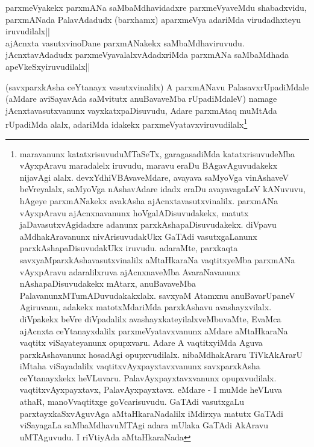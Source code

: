 
\begin{artha} 
parxmeVyakekx parxmANa saMbaMdhavidadxre parxmeVyaveMdu shabadxvidu, 
parxmANada PalavAdadudx (barxhamx) aparxmeVya adariMda virudadhxteyu 
iruvudilalx||\\
ajAcnxta vasutxvinoDane parxmANakekx saMbaMdhaviruvudu. 
jAcnxtavAdadudx parxmeVyavalalxvAdadxriMda parxmANa saMbaMdhada 
apeVkeSxyiruvudilalx||
\end{artha}


\begin{artha} 
(savxparxkAsha ceYtanayx vasutxvinalilx) A parxmANavu 
PalasavxrUpadiMdale (aMdare aviSayavAda saMvitutx anuBavaveMba 
rUpadiMdaleV) namage jAcnxtavasutxvanunx vayxkatxpaDisuvudu, Adare 
parxmAtaq muMtAda rUpadiMda alalx, adariMda idakekx 
parxmeVyatavxviruvudilalx\footnote[1]{maravanunx 
katatxrisuvuduMTaSeTx, garagasadiMda katatxrisuvudeMba vAyxpAravu 
maradalelx iruvudu, maravu eraDu BAgavAguvudakekx nijavAgi alalx. 
devxYdhiVBAvaveMdare, avayava saMyoVga vinAshaveV beVreyalalx, 
saMyoVga nAshavAdare idadx eraDu avayavagaLeV kANuvuvu, hAgeye 
parxmANakekx avakAsha ajAcnxtavasutxvinalilx. parxmANa vAyxpAravu 
ajAcnxnavanunx hoVgalADisuvudakekx, matutx jaDavasutxvAgidadxre 
adanunx parxkAshapaDisuvudakekx. diVpavu aMdhakAravanunx 
nivArisuvudakUkx GaTAdi vasutxgaLanunx parxkAshapaDisuvudakUkx 
iruvudu. adaraMte, parxkaqta savxyaMparxkAshavasutxvinalilx 
aMtaHkaraNa vaqtitxyeMba parxmANa vAyxpAravu adaralilxruva 
ajAcnxnaveMba AvaraNavanunx nAshapaDisuvudakekx mAtarx, anuBavaveMba 
PalavanunxMTumADuvudakakxlalx. savxyaM Atamxnu anuBavarUpaneV 
Agiruvanu, adakekx matotxMdariMda parxkAshavu avashayxvilalx. 
diVpakekx beVre diVpadalilx avashayxkateyilalxveMbuvaMte, EvaMca 
ajAcnxta ceYtanayxdalilx parxmeVyatavxvanunx aMdare aMtaHkaraNa 
vaqtitx viSayateyanunx opupxvaru. Adare A vaqtitxyiMda Aguva 
parxkAshavanunx hosadAgi opupxvudilalx. nibaMdhakAraru TiVkAkArarU 
iMtaha viSayadalilx vaqtitxvAyxpayxtavxvanunx savxparxkAsha 
ceYtanayxkekx heVLuvaru. PalavAyxpayxtavxvanunx opupxvudilalx. 
vaqtitxvAyxpayxtavx, PalavAyxpayxtavx. eMdare - I muMde heVLuva athaR, 
manoVvaqtitxge goVcarisuvudu. GaTAdi vasutxgaLu parxtayxkaSxvAguvAga 
aMtaHkaraNadalilx iMdirxya matutx GaTAdi viSayagaLa saMbaMdhavuMTAgi 
adara mUlaka GaTAdi AkAravu uMTAguvudu. I riVtiyAda aMtaHkaraNada 
}
\end{artha}
